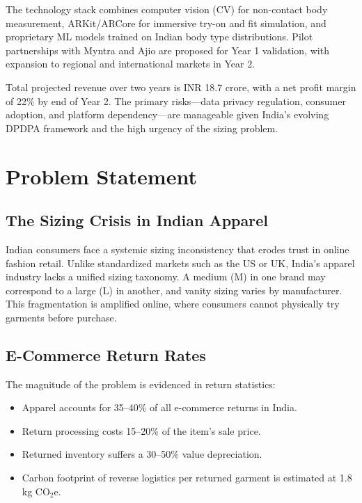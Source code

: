 \documentclass[12pt,a4paper]{article}
\begin{document}
The technology stack combines computer vision (CV) for non-contact body measurement, ARKit/ARCore for immersive try-on and fit simulation, and proprietary ML models trained on Indian body type distributions. Pilot partnerships with Myntra and Ajio are proposed for Year 1 validation, with expansion to regional and international markets in Year 2.

Total projected revenue over two years is INR 18.7 crore, with a net profit margin of 22\% by end of Year 2. The primary risks---data privacy regulation, consumer adoption, and platform dependency---are manageable given India's evolving DPDPA framework and the high urgency of the sizing problem.

\newpage

\section{Problem Statement}

\subsection{The Sizing Crisis in Indian Apparel}

Indian consumers face a systemic sizing inconsistency that erodes trust in online fashion retail. Unlike standardized markets such as the US or UK, India's apparel industry lacks a unified sizing taxonomy. A medium (M) in one brand may correspond to a large (L) in another, and vanity sizing varies by manufacturer. This fragmentation is amplified online, where consumers cannot physically try garments before purchase.

\subsection{E-Commerce Return Rates}

The magnitude of the problem is evidenced in return statistics:

\begin{itemize}
    \item Apparel accounts for 35--40\% of all e-commerce returns in India.
    \item Return processing costs 15--20\% of the item's sale price.
    \item Returned inventory suffers a 30--50\% value depreciation.
    \item Carbon footprint of reverse logistics per returned garment is estimated at 1.8 kg CO$_2$e.
\end{itemize}
\end{document}
